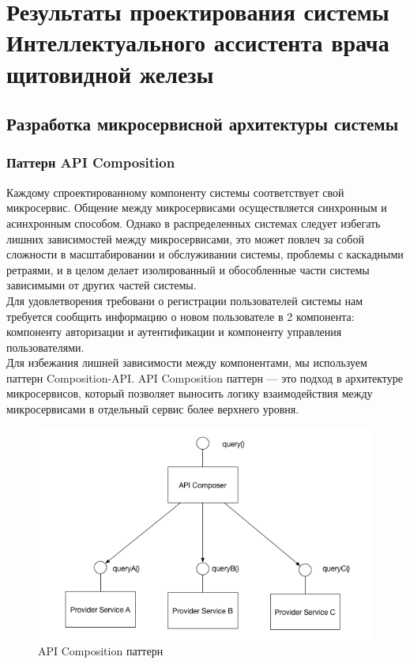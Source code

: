 \chapter{Результаты проектирования системы Интеллектуального ассистента врача щитовидной железы}

\section{Разработка микросервисной архитектуры системы}

\subsection{Паттерн API Composition}
Каждому спроектированному компоненту системы соответствует свой микросервис. Общение между микросервисами осуществляется 
синхронным и асинхронным способом. Однако в распределенных системах следует избегать лишних зависимостей между микросервисами, это
может повлеч за собой сложности в масштабировании и обслуживании системы, проблемы с каскадными ретраями, и в целом делает изолированный и
обособленные части системы зависимыми от других частей системы.\\
Для удовлетворения требовани о регистрации пользователей системы нам требуется сообщить информацию о новом пользователе в 2 компонента:
компоненту авторизации и аутентификации и компоненту управления пользователями.\\
Для избежания лишней зависимости между компонентами, мы используем паттерн Composition-API\cite{hohpe2003eip}. API Composition паттерн 
— это подход в архитектуре микросервисов, который позволяет выносить логику взаимодействия между микросервисами в отдельный сервис более верхнего уровня.

\begin{figure}[H]%
	\begin{center}
		\includegraphics[width=.6\columnwidth]{./img/new/api_composition_pattern.png}%
	\end{center}
	\caption{API Composition паттерн}%
	\label{pic:api_composition_pattern}%
\end{figure}


